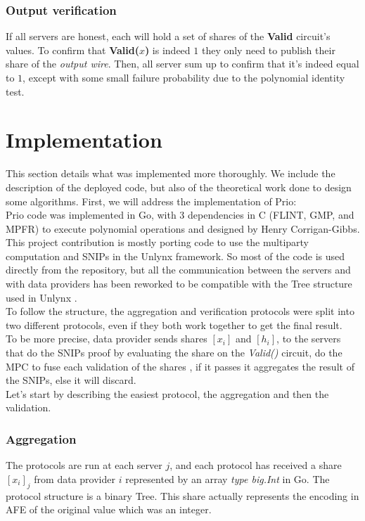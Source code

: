 \documentclass{article}
\begin{document}
\subsubsection{Output verification}
If all servers are honest, each will hold a set of shares of the \textbf{Valid} circuit's values. To confirm that \textbf{Valid($x$)} is indeed $1$ they only need to publish their share of the \textit{output wire}. Then, all server sum up to confirm that it's indeed equal to $1$, except with some small failure probability due to the polynomial identity test.


\section{Implementation}
This section details what was implemented more thoroughly. We include the description of the deployed code, but also of the theoretical work done to design some algorithms.
First, we will address the implementation of Prio:\\

Prio code \cite{priocode} was implemented in Go, with 3 dependencies in C (FLINT, GMP, and MPFR) to execute polynomial operations and designed by Henry Corrigan-Gibbs.\\
This project contribution is mostly porting code to use the multiparty computation and SNIPs in the Unlynx framework. So most of the code is used directly from the repository, but all the communication between the servers and with data providers has been reworked to be compatible with the Tree structure used in Unlynx \cite{unlynxcode}.\\
To follow the structure, the aggregation and verification protocols were split into two different protocols, even if they both work together to get the final result.\\
To be more precise, data provider sends shares $[x_i]$ and $[h_i]$, to the servers that do the SNIPs proof by evaluating the share on the \textit{Valid()} circuit, do the MPC to fuse each validation of the shares , if it passes it aggregates the result of the SNIPs, else it will discard.\\
Let's start by describing the easiest protocol, the aggregation and then the validation.\\
\subsubsection*{Aggregation}
The protocols are run at each server $j$, and each protocol has received a share $[x_i]_j$ from data provider $i$ represented by an array \textit{type big.Int} in Go. The protocol structure is a binary Tree.
This share actually represents the encoding in AFE of the original value which was an integer.\\
\end{document}
